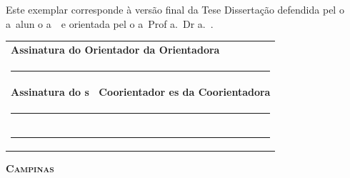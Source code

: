 \vfill



\begin{flushleft}
  \begin{minipage}[c]{.5\textwidth}\footnotesize 
 Este exemplar corresponde à versão final da
\ifx\mestrado\undefined
    Tese
    \else
    Dissertação
    \fi
    defendida pel\ifx\femaleOrientador\undefined
    o\else
  a\fi\
  alun\ifx\femaleOrientador\undefined
    o\else
  a\fi\
  \autor\
    e orientada 
    pel\ifx\femaleOrientador\undefined
    o\else
  a\fi\
  Prof\ifx\femaleOrientador\undefined
    \else
  a\fi.~Dr\ifx\femaleOrientador\undefined
    \else
  a\fi.~\orientador.
 \end{minipage}
\end{flushleft}

\vfill
\noindent
\begin{tabular}{l}
{\small\textbf{Assinatura
\ifx\femaleOrientador\undefined
do Orientador
\else
da Orientadora
\fi
}} \\[0.6cm]
\rule[1pt]{7cm}{.5pt} 
\\[0.4cm]
\ifx\coorientador\undefined
\else
{\small\textbf{Assinatura
\ifx\femaleCoorientador\undefined
do\ifx\Coorientadores\undefined
\else s \fi\
Coorientador\ifx\Coorientadores\undefined
\else es \fi 
\else
da Coorientadora
\fi } }
 \\[0.6cm]
\rule[1pt]{7cm}{.5pt}  %
 \ifx\Coorientadores\undefined
 \else
 \\[0.6cm]
\rule[1pt]{7cm}{.5pt}  %
\fi
\end{tabular}

\vfill
\begin{center}
  {\small\textbf{\textsc{ Campinas \\ \ano}}}
\end{center}
